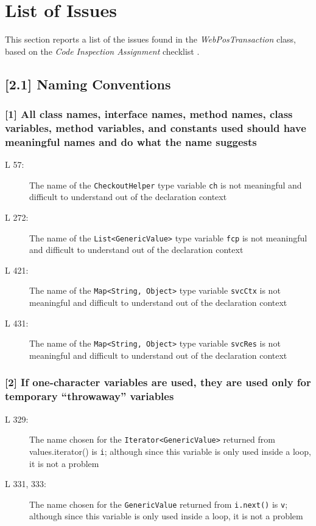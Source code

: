 \section{List of Issues}
This section reports a list of the issues found in the \emph{WebPosTransaction} class, based on the \emph{Code Inspection Assignment} checklist \cite{Assignment}.
\subsection*{[2.1] Naming Conventions}
\subsubsection*{[1] All class names, interface names, method names, class variables, method variables, and constants used should have meaningful names and do what the name suggests}
\begin{description}
	\item[L 57:] The name of the {\tt CheckoutHelper} type variable {\tt ch} is not meaningful and difficult to understand out of the declaration context
	\item[L 272:] The name of the {\tt List<GenericValue>} type variable {\tt fcp} is not meaningful and difficult to understand out of the declaration context
	\item[L 421:] The name of the {\tt Map<String, Object>} type variable {\tt svcCtx} is not meaningful and difficult to understand out of the declaration context
	\item[L 431:] The name of the {\tt Map<String, Object>} type variable {\tt svcRes} is not meaningful and difficult to understand out of the declaration context
\end{description}

\subsubsection*{[2] If one-character variables are used, they are used only for temporary “throwaway” variables}
\begin{description}
	\item[L 329:] The name chosen for the {\tt Iterator<GenericValue>} returned from {values.iterator()} is {\tt i}; although since this variable is only used inside a loop, it is not a problem
	\item[L 331, 333:] The name chosen for the {\tt GenericValue} returned from {\tt i.next()} is {\tt v}; although since this variable is only used inside a loop, it is not a problem
\end{description}

